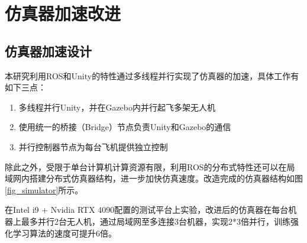 \section{仿真器加速改进}
\subsection{仿真器加速设计}
本研究利用ROS和Unity的特性通过多线程并行实现了仿真器的加速，具体工作有如下三点：
\begin{enumerate}
  \item 多线程并行Unity，并在Gazebo内并行起飞多架无人机
  \item 使用统一的桥接（Bridge）节点负责Unity和Gazebo的通信
  \item 并行控制器节点为每台飞机提供独立控制
\end{enumerate}

除此之外，受限于单台计算机计算资源有限，利用ROS的分布式特性还可以在局域网内搭建分布式仿真器结构，进一步加快仿真速度。改造完成的仿真器结构如图\ref{fig_simulator}所示。

在Intel i9 + Nvidia RTX 4090配置的测试平台上实验，改进后的仿真器在每台机器上最多并行2台无人机，通过局域网至多连接3台机器，实现2*3倍并行，训练强化学习算法的速度可提升6倍。







